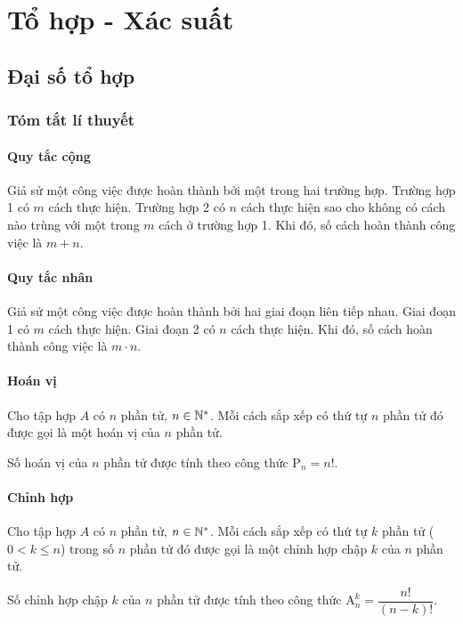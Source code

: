 \chapter{Tổ hợp - Xác suất}
\section{Đại số tổ hợp}
\subsection{Tóm tắt lí thuyết}
\subsubsection{Quy tắc cộng}

\begin{dl}
	Giả sử một công việc được hoàn thành bởi một trong hai trường hợp. Trường hợp 1 có $m$ cách thực hiện. Trường hợp 2 có $n$ cách thực hiện sao cho không có cách nào trùng với một trong $m$ cách ở trường hợp 1. Khi đó, số cách hoàn thành công việc là $m+n$.
\end{dl}
\subsubsection{Quy tắc nhân}
\begin{dl}
	Giả sử một công việc được hoàn thành bởi hai giai đoạn liên tiếp nhau. Giai đoạn 1 có $m$ cách thực hiện. Giai đoạn 2 có $n$ cách thực hiện. Khi đó, số cách hoàn thành công việc là $m\cdot n$.
\end{dl}
\subsubsection{Hoán vị}
\begin{dn}
	Cho tập hợp $A$ có $n$ phần tử,  $n\in \Bbb N^*$. Mỗi cách sắp xếp có thứ tự $n$ phần tử đó được gọi là một hoán vị của $n$ phần tử.
\end{dn}
\begin{dl}
	Số hoán vị của $n$ phần tử được tính theo công thức $\mathrm{P}_n = n!$.
\end{dl}
\subsubsection{Chỉnh hợp}
\begin{dn}
	Cho tập hợp $A$ có $n$ phần tử,  $n\in \Bbb N^*$. Mỗi cách sắp xếp có thứ tự $k$ phần tử ($0< k \le n$) trong số $n$ phần tử đó được gọi là một chỉnh hợp chập $k$ của $n$ phần tử.
\end{dn}
\begin{dl}
	Số chỉnh hợp chập $k$ của $n$ phần tử được tính theo công thức $\mathrm{A}^k_n = \dfrac{n!}{(n-k)!}$.
\end{dl}
